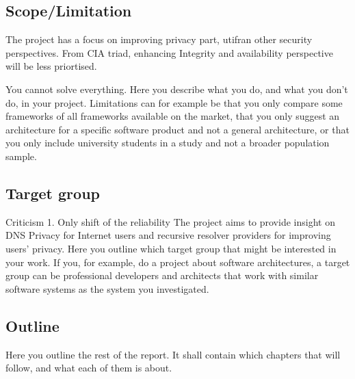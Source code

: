 \documentclass[a4paper,12pt]{article}
\begin{document}
\subsection{Scope/Limitation}
The project has a focus on improving privacy part, utifran other security perspectives. From CIA triad, enhancing Integrity and availability perspective will be less priortised.

You cannot solve everything. Here you describe what you do, and what you don't do, in your project. Limitations can for example be that you only compare some frameworks of all frameworks available on the market, that you only suggest an architecture for a specific software product and not a general architecture, or that you only include university students in a study and not a broader population sample.

\subsection{Target group}
Criticism
1. Only shift of the reliability
The project aims to provide insight on DNS Privacy for Internet users and recursive resolver providers for improving users' privacy.
Here you outline which target group that might be interested in your work. If you, for example, do a project about software architectures, a target group can be professional developers and architects that work with similar software systems as the system you investigated.

\subsection{Outline}
Here you outline the rest of the report. It shall contain which chapters that will follow, and what each of them is about.

\newpage
\
\end{document}
